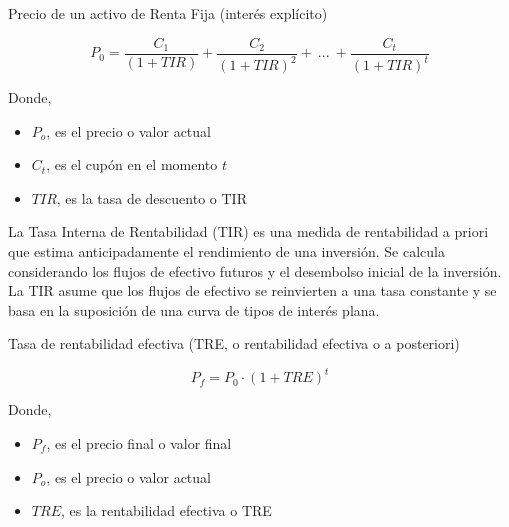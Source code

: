 \documentclass[
  letterpaper,
  DIV=11,
  numbers=noendperiod]{scrartcl}
\begin{document}
\begin{tcolorbox}[enhanced jigsaw, colframe=quarto-callout-note-color-frame, opacityback=0, colback=white, leftrule=.75mm, left=2mm, breakable, arc=.35mm, rightrule=.15mm, toprule=.15mm, bottomrule=.15mm]
\begin{minipage}[t]{5.5mm}
\textcolor{quarto-callout-note-color}{\faInfo}
\end{minipage}%
\begin{minipage}[t]{\textwidth - 5.5mm}

Precio de un activo de Renta Fija (interés explícito)

\[P_0=\frac{C_1}{(1+TIR)}+\frac{C_2}{(1+TIR)^2}+\ ... \ +\frac{C_t}{(1+TIR)^t}\]

Donde,

\begin{itemize}
\item
  \(P_o\), es el precio o valor actual
\item
  \(C_t\), es el cupón en el momento \(t\)
\item
  \(TIR\), es la tasa de descuento o TIR
\end{itemize}

\end{minipage}%
\end{tcolorbox}

La Tasa Interna de Rentabilidad (TIR) es una medida de rentabilidad a
priori que estima anticipadamente el rendimiento de una inversión. Se
calcula considerando los flujos de efectivo futuros y el desembolso
inicial de la inversión. La TIR asume que los flujos de efectivo se
reinvierten a una tasa constante y se basa en la suposición de una curva
de tipos de interés plana.

\begin{tcolorbox}[enhanced jigsaw, colframe=quarto-callout-note-color-frame, opacityback=0, colback=white, leftrule=.75mm, left=2mm, breakable, arc=.35mm, rightrule=.15mm, toprule=.15mm, bottomrule=.15mm]
\begin{minipage}[t]{5.5mm}
\textcolor{quarto-callout-note-color}{\faInfo}
\end{minipage}%
\begin{minipage}[t]{\textwidth - 5.5mm}

Tasa de rentabilidad efectiva (TRE, o rentabilidad efectiva o a
posteriori)

\[P_f=P_0 \cdot \left(1+{TRE}\right)^t\]

Donde,

\begin{itemize}
\item
  \(P_f\), es el precio final o valor final
\item
  \(P_o\), es el precio o valor actual
\item
  \(TRE\), es la rentabilidad efectiva o TRE
\end{itemize}

\end{minipage}%
\end{tcolorbox}
\end{document}
